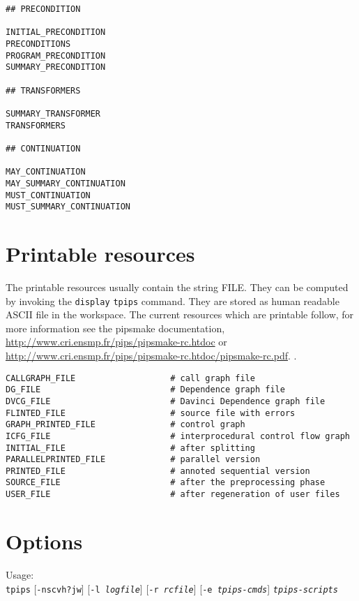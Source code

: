 \documentclass[a4paper]{article}
\newcommand{\PipsPIPSmakePDF}{\url{http://www.cri.ensmp.fr/pips/pipsmake-rc.htdoc/pipsmake-rc.pdf}\xspace}
\newcommand{\PipsPIPSmakeHTDOC}{\url{http://www.cri.ensmp.fr/pips/pipsmake-rc.htdoc}\xspace}
\begin{document}
\begin{verbatim}
## PRECONDITION                   

INITIAL_PRECONDITION                    
PRECONDITIONS    
PROGRAM_PRECONDITION
SUMMARY_PRECONDITION

## TRANSFORMERS 

SUMMARY_TRANSFORMER
TRANSFORMERS 

## CONTINUATION 

MAY_CONTINUATION
MAY_SUMMARY_CONTINUATION
MUST_CONTINUATION
MUST_SUMMARY_CONTINUATION
\end{verbatim}


\section{Printable resources}
\label{resf}

The printable resources usually contain the string FILE. They can be
computed by invoking the \verb+display+ {\tt tpips} command. They are
stored as human readable ASCII file in the workspace. The current
resources which are printable follow, for more information see the
pipsmake documentation, \PipsPIPSmakeHTDOC or \PipsPIPSmakePDF.  .

\begin{verbatim}
CALLGRAPH_FILE                   # call graph file
DG_FILE                          # Dependence graph file         
DVCG_FILE                        # Davinci Dependence graph file 
FLINTED_FILE                     # source file with errors
GRAPH_PRINTED_FILE               # control graph
ICFG_FILE                        # interprocedural control flow graph       
INITIAL_FILE                     # after splitting      
PARALLELPRINTED_FILE             # parallel version
PRINTED_FILE                     # annoted sequential version 
SOURCE_FILE                      # after the preprocessing phase
USER_FILE                        # after regeneration of user files
\end{verbatim}


\section{Options}

Usage:\\
\texttt{tpips} [\texttt{-nscvh?jw}] [\texttt{-l \emph{logfile}}]
[\texttt{-r \emph{rcfile}}] [\texttt{-e \emph{tpips-cmds}}]
\texttt{\emph{tpips-scripts}}
\end{document}

